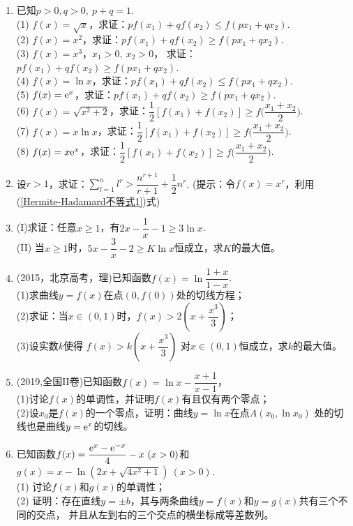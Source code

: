 \begin{enumerate}[label={\textbf{\arabic*.}},leftmargin=
    \inteval{\myenumleftmargin}pt]
\item 已知$ p>0,q>0,\ p+q=1$. \\
(1) $f(x)=\sqrt{x} $，求证：$ pf(x_1)+qf(x_2)\leq f(px_1+qx_2) $. \\
(2) $f(x)=x^2 $，求证：$ pf(x_1)+qf(x_2)\geq f(px_1+qx_2) $. \\
(3) $f(x)=x^3 $，$ x_1>0,\ x_2>0 $，
求证：$ pf(x_1)+qf(x_2)\geq f(px_1+qx_2) $. \\
(4) $f(x)=\ln x $，求证：$ pf(x_1)+qf(x_2)\leq f(px_1+qx_2) $. \\
(5) $f(x)=\mathrm{e}^x $，求证：$ pf(x_1)+qf(x_2)\geq f(px_1+qx_2) $. \\
(6) $f(x)=\sqrt{x^2+2} $，求证：$ \dfrac{1}{2}[f(x_1)+f(x_2)]\geq 
f\Big(\dfrac{x_1+x_2}{2}\Big) $. \\
(7) $f(x)=x\ln x $，求证：$ \dfrac{1}{2}[f(x_1)+f(x_2)]\geq 
f\Big(\dfrac{x_1+x_2}{2}\Big) $. \\
(8) $f(x)=x\mathrm{e}^x $，求证：$ \dfrac{1}{2}[f(x_1)+f(x_2)]\geq 
f\Big(\dfrac{x_1+x_2}{2}\Big) $. 

\item 设$ r>1 $，求证：$ \sum\limits_{l=1}^n l^r>\dfrac{n^{r+1}}{r+1}+\dfrac{1}{2}n^r $.
(提示：令$ f(x)=x^r $，利用(\ref{Hermite-Hadamard不等式1})式) 

\item (I)求证：任意$ x\geq 1 $，有$ 2x-\dfrac{1}{x}-1\geq 3\ln x $.\\
(II) 当$ x\geq 1 $时，$ 5x-\dfrac{3}{x}-2\geq K\ln x $恒成立，求$ K $的最大值。

\item (2015，北京高考，理)已知函数$ f(x)=\ln\dfrac{1+x}{1-x} $.\\
(1)求曲线$ y=f(x) $在点$ (0,f(0)) $处的切线方程；\\
(2)求证：当$ x\in(0,1) $时，$ f(x)>2\left(x+\dfrac{x^{3}}{3}\right) $；\\
(3)设实数$ k $使得 $ f(x)>k\left(x+\dfrac{x^{3}}{3}\right) $
对$ x\in(0,1) $恒成立，求$ k $的最大值。

\item 
(2019,全国II卷)已知函数$ f(x)=\ln x-\dfrac{x+1}{x-1} $，\\
(1)讨论$ f(x) $的单调性，并证明$ f(x) $有且仅有两个零点；\\
(2)设$ x_0 $是$ f(x) $的一个零点，证明：曲线$ y=\ln x $在点$ A(x_0,\ln x_0) $
处的切线也是曲线$ y=\mathrm{e}^x $的切线。

\item 已知函数$f(x)=\dfrac{\mathrm{e}^x-\mathrm{e}^{-x}}{4}-x\ (x>0) $和
$ g(x)=x-\ln(2x+\sqrt{4x^2+1})\ (x>0) $. \\
(1) 讨论$ f(x) $和$ g(x) $的单调性；\\
(2) 证明：存在直线$y=\pm b$，其与两条曲线$y=f(x)$和$y=g(x)$共有三个不同的交点，
并且从左到右的三个交点的横坐标成等差数列。


\end{enumerate}
